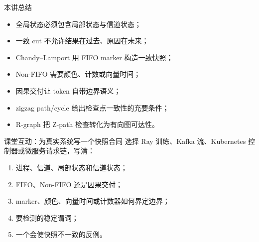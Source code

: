 \documentclass[UTF8,fontset=none,aspectratio=169,10pt]{beamer}
\begin{document}
\begin{frame}{本讲总结}
\begin{itemize}
  \item 全局状态必须包含局部状态与信道状态；
  \item 一致 cut 不允许结果在过去、原因在未来；
  \item Chandy--Lamport 用 FIFO marker 构造一致快照；
  \item Non-FIFO 需要颜色、计数或向量时间；
  \item 因果交付让 token 自带边界语义；
  \item zigzag path/cycle 给出检查点一致性的充要条件；
  \item R-graph 把 Z-path 检查转化为有向图可达性。
\end{itemize}
\end{frame}

\begin{frame}{课堂互动：为真实系统写一个快照合同}
选择 Ray 训练、Kafka 流、Kubernetes 控制器或微服务请求链，写清：
\begin{enumerate}
  \item 进程、信道、局部状态和信道状态；
  \item FIFO、Non-FIFO 还是因果交付；
  \item marker、颜色、向量时间或计数器如何界定边界；
  \item 要检测的稳定谓词；
  \item 一个会使快照不一致的反例。
\end{enumerate}
\end{frame}

\begin{frame}[plain]
\end{frame}
\end{document}

